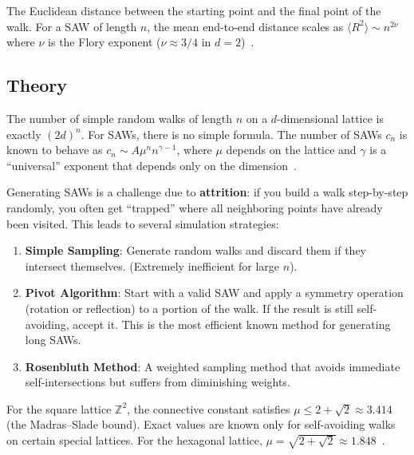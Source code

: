 \begin{definition}\label{def:end_to_end_distance}
The Euclidean distance between the starting point and the final point of the walk. For a SAW of length $n$, the mean end-to-end distance scales as $\langle R^2 \rangle \sim n^{2\nu}$ where $\nu$ is the Flory exponent ($\nu \approx 3/4$ in $d=2$)~\cite{flory1953}.
\end{definition}

\subsection{Theory}
The number of simple random walks of length $n$ on a $d$-dimensional lattice is exactly $(2d)^n$. For SAWs, there is no simple formula. The number of SAWs $c_n$ is known to behave as $c_n \sim A \mu^n n^{\gamma-1}$, where $\mu$ depends on the lattice and $\gamma$ is a ``universal'' exponent that depends only on the dimension~\cite{madras1996}.

Generating SAWs is a challenge due to \textbf{attrition}: if you build a walk step-by-step randomly, you often get ``trapped'' where all neighboring points have already been visited. This leads to several simulation strategies:
\begin{enumerate}
    \item \textbf{Simple Sampling}: Generate random walks and discard them if they intersect themselves. (Extremely inefficient for large $n$).
    \item \textbf{Pivot Algorithm}: Start with a valid SAW and apply a symmetry operation (rotation or reflection) to a portion of the walk. If the result is still self-avoiding, accept it. This is the most efficient known method for generating long SAWs.
    \item \textbf{Rosenbluth Method}: A weighted sampling method that avoids immediate self-intersections but suffers from diminishing weights.
\end{enumerate}

\begin{theorem}\label{thm:connective_constant}
For the square lattice $\mathbb{Z}^2$, the connective constant satisfies $\mu \le 2 + \sqrt{2} \approx 3.414$ (the Madras--Slade bound). Exact values are known only for self-avoiding walks on certain special lattices. For the hexagonal lattice, $\mu = \sqrt{2 + \sqrt{2}} \approx 1.848$~\cite{madras1996}.
\end{theorem}

